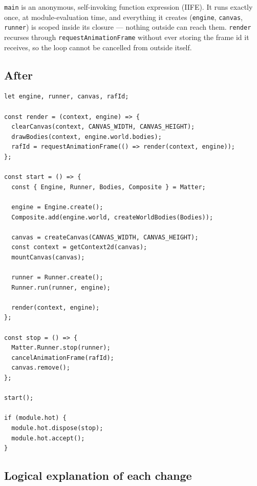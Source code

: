 \documentclass{article}
\begin{document}
\texttt{main} is an anonymous, self-invoking function expression (IIFE). It
runs exactly once, at module-evaluation time, and everything it creates
(\texttt{engine}, \texttt{canvas}, \texttt{runner}) is scoped inside its
closure --- nothing outside can reach them. \texttt{render} recurses through
\texttt{requestAnimationFrame} without ever storing the frame id it
receives, so the loop cannot be cancelled from outside itself.

\subsection{After}

\begin{lstlisting}[style=js]
let engine, runner, canvas, rafId;

const render = (context, engine) => {
  clearCanvas(context, CANVAS_WIDTH, CANVAS_HEIGHT);
  drawBodies(context, engine.world.bodies);
  rafId = requestAnimationFrame(() => render(context, engine));
};

const start = () => {
  const { Engine, Runner, Bodies, Composite } = Matter;

  engine = Engine.create();
  Composite.add(engine.world, createWorldBodies(Bodies));

  canvas = createCanvas(CANVAS_WIDTH, CANVAS_HEIGHT);
  const context = getContext2d(canvas);
  mountCanvas(canvas);

  runner = Runner.create();
  Runner.run(runner, engine);

  render(context, engine);
};

const stop = () => {
  Matter.Runner.stop(runner);
  cancelAnimationFrame(rafId);
  canvas.remove();
};

start();

if (module.hot) {
  module.hot.dispose(stop);
  module.hot.accept();
}
\end{lstlisting}

\subsection{Logical explanation of each change}
\end{document}
